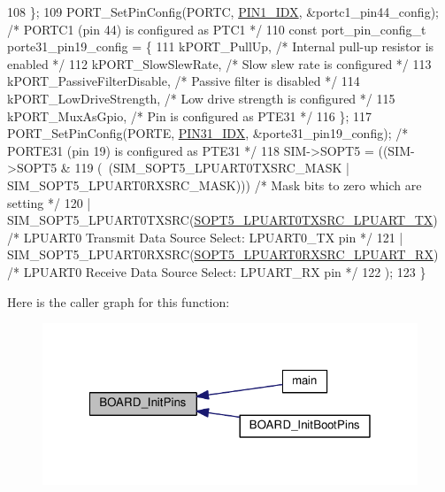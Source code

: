 \begin{DoxyCode}
108   \};
109   PORT\_SetPinConfig(PORTC, \hyperlink{pin__mux_8c_af36e8fbe0cdf23dbe5fe82d0a1abe929}{PIN1\_IDX}, &portc1\_pin44\_config);  \textcolor{comment}{/* PORTC1 (pin 44) is configured as
       PTC1 */}
110   \textcolor{keyword}{const} port\_pin\_config\_t porte31\_pin19\_config = \{
111     kPORT\_PullUp,                                            \textcolor{comment}{/* Internal pull-up resistor is enabled */}
112     kPORT\_SlowSlewRate,                                      \textcolor{comment}{/* Slow slew rate is configured */}
113     kPORT\_PassiveFilterDisable,                              \textcolor{comment}{/* Passive filter is disabled */}
114     kPORT\_LowDriveStrength,                                  \textcolor{comment}{/* Low drive strength is configured */}
115     kPORT\_MuxAsGpio,                                         \textcolor{comment}{/* Pin is configured as PTE31 */}
116   \};
117   PORT\_SetPinConfig(PORTE, \hyperlink{pin__mux_8c_ad3f3f3f40fb3dfe98dd2ec8d06d12a91}{PIN31\_IDX}, &porte31\_pin19\_config); \textcolor{comment}{/* PORTE31 (pin 19) is configured as
       PTE31 */}
118   SIM->SOPT5 = ((SIM->SOPT5 &
119     (~(SIM\_SOPT5\_LPUART0TXSRC\_MASK | SIM\_SOPT5\_LPUART0RXSRC\_MASK))) \textcolor{comment}{/* Mask bits to zero which are setting 
      */}
120       | SIM\_SOPT5\_LPUART0TXSRC(\hyperlink{pin__mux_8c_ab1b68d7a21112e9371b021390fcb2204}{SOPT5\_LPUART0TXSRC\_LPUART\_TX}) \textcolor{comment}{/* LPUART0
       Transmit Data Source Select: LPUART0\_TX pin */}
121       | SIM\_SOPT5\_LPUART0RXSRC(\hyperlink{pin__mux_8c_ae37cc1f248b28e553138ab4e54967c57}{SOPT5\_LPUART0RXSRC\_LPUART\_RX}) \textcolor{comment}{/* LPUART0 Receive
       Data Source Select: LPUART\_RX pin */}
122     );
123 \}
\end{DoxyCode}


Here is the caller graph for this function\-:
\nopagebreak
\begin{figure}[H]
\begin{center}
\leavevmode
\includegraphics[width=320pt]{group__pin__mux_ga2c9fe54b6b84723fbaa590a6f4576966_icgraph}
\end{center}
\end{figure}


